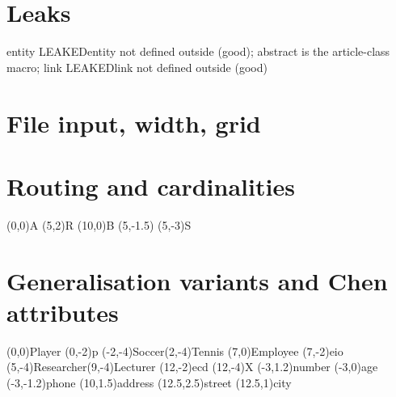\documentclass{article}
\begin{document}
\section*{Leaks}
\ifdefined\entity entity LEAKED\else entity not defined outside (good)\fi;
\ifdefined\abstract abstract is the article-class macro\fi;
\ifdefined\link link LEAKED\else link not defined outside (good)\fi

\section*{File input, width, grid}

\quad
{}

\section*{Routing and cardinalities}
\begin{erdiagram}[card placement=beside]
  (0,0){A}
  (5,2){R}
  (10,0){B}
  (5,-1.5)
  (5,-3){S}
\end{erdiagram}

\section*{Generalisation variants and Chen attributes}
\begin{erdiagram}
  (0,0){Player}
  (0,-2){p}
  (-2,-4){Soccer}(2,-4){Tennis}
  (7,0){Employee}
  (7,-2){e}{io}
  (5,-4){Researcher}(9,-4){Lecturer}
  (12,-2){e}{cd}
  (12,-4){X}
  (-3,1.2){number}
  (-3,0){age}
  (-3,-1.2){phone}
  (10,1.5){address}
  (12.5,2.5){street}
  (12.5,1){city}
\end{erdiagram}
\end{document}
